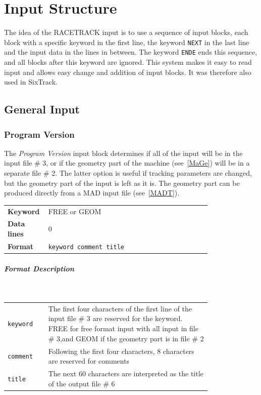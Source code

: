 
\chapter{Input Structure} \label{InpStr}

The idea of the RACETRACK input is to use a sequence of input blocks, each block with a specific keyword in the first line, the keyword \texttt{NEXT} in the last line and the input data in the lines in between.
The keyword \texttt{ENDE} ends this sequence, and all blocks after this keyword are ignored.
This system makes it easy to read input and allows easy change and addition of input blocks. It was therefore also used in SixTrack\@.

\section{General Input}

\subsection{Program Version} \label{ProVer}

The \textit{Program Version} input block determines if all of the input will be in the input file \# 3, or if the geometry part of the machine (see~\ref{MaGe}) will be in a separate file \# 2.
The latter option is useful if tracking parameters are changed, but the geometry part of the input is left as it is.
The geometry part can be produced directly from a MAD input file (see~\ref{MADT}).

\bigskip
\begin{tabular}{@{}lp{0.8\linewidth}}
    \textbf{Keyword}    & FREE or GEOM \\
    \textbf{Data lines} & 0 \\
    \textbf{Format}     & \texttt{keyword comment title} \\
\end{tabular}

\paragraph{Format Description}~

\bigskip
\begin{tabular}{@{}lp{0.8\linewidth}}
    \texttt{keyword} & The first four characters of the first line of the input file \# 3 are reserved for the keyword. FREE for free format input with all input in file \# 3,and GEOM if the geometry part is in file \# 2 \\
    \texttt{comment} & Following the first four characters, 8 characters are reserved for comments \\
    \texttt{title}   & The next 60 characters are interpreted as the title of the output file \# 6
\end{tabular}

